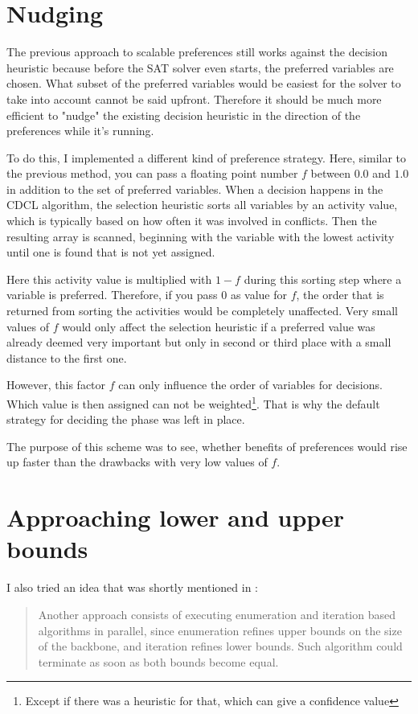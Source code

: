\section{Nudging}
\label{sec:nudging}
The previous approach to scalable preferences still works against the decision heuristic because before the SAT solver even starts, the preferred variables are chosen. What subset of the preferred variables would be easiest for the solver to take into account cannot be said upfront. Therefore it should be much more efficient to "nudge" the existing decision heuristic in the direction of the preferences while it's running.

To do this, I implemented a different kind of preference strategy. Here, similar to the previous method, you can pass a floating point number $f$ between $0.0$ and $1.0$ in addition to the set of preferred variables. When a decision happens in the CDCL algorithm, the selection heuristic sorts all variables by an activity value, which is typically based on how often it was involved in conflicts. Then the resulting array is scanned, beginning with the variable with the lowest activity until one is found that is not yet assigned. 

Here this activity value is multiplied with $1-f$ during this sorting step where a variable is preferred. Therefore, if you pass $0$ as value for $f$, the order that is returned from sorting the activities would be completely unaffected. Very small values of $f$ would only affect the selection heuristic if a preferred value was already deemed very important but only in second or third place with a small distance to the first one. 

However, this factor $f$ can only influence the order of variables for decisions. Which value is then assigned can not be weighted\footnote{Except if there was a heuristic for that, which can give a confidence value}. That is why the default strategy for deciding the phase was left in place. 


The purpose of this scheme was to see, whether benefits of preferences would rise up faster than the drawbacks with very low values of $f$.

\section{Approaching lower and upper bounds}
\label{sec:upperLower}
I also tried an idea that was shortly mentioned in \cite[Chapter 3.4]{mjl10}: \blockquote{Another approach consists of executing enumeration and iteration based algorithms in parallel, since enumeration refines upper bounds on the size of the backbone, and iteration refines lower bounds. Such algorithm could terminate as soon as both bounds become equal.}

